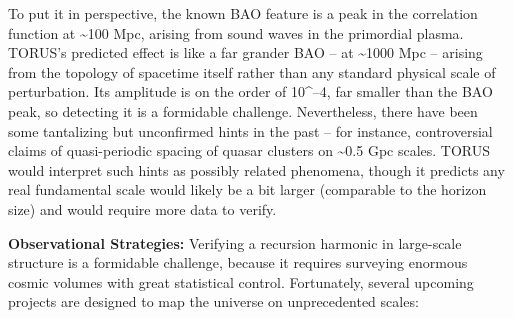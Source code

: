 \documentclass[
]{article}
\begin{document}
To put it in perspective, the known BAO feature is a peak in the
correlation function at \textasciitilde100 Mpc, arising from sound waves
in the primordial plasma. TORUS's predicted effect is like a far grander
BAO -- at \textasciitilde1000 Mpc -- arising from the topology of
spacetime itself rather than any standard physical scale of
perturbation. Its amplitude is on the order of 10\^{}--4, far smaller
than the BAO peak, so detecting it is a formidable challenge.
Nevertheless, there have been some tantalizing but unconfirmed hints in
the past -- for instance, controversial claims of quasi-periodic spacing
of quasar clusters on \textasciitilde0.5 Gpc scales. TORUS would
interpret such hints as possibly related phenomena, though it predicts
any real fundamental scale would likely be a bit larger (comparable to
the horizon size) and would require more data to verify.

\textbf{Observational Strategies:} Verifying a recursion harmonic in
large-scale structure is a formidable challenge, because it requires
surveying enormous cosmic volumes with great statistical control.
Fortunately, several upcoming projects are designed to map the universe
on unprecedented scales:
\end{document}
